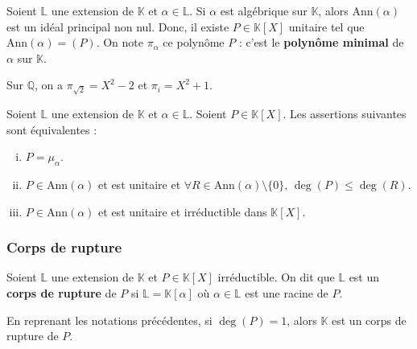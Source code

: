 	\begin{definition}
		Soient $\mathbb{L}$ une extension de $\mathbb{K}$ et $\alpha \in \mathbb{L}$. Si $\alpha$ est algébrique sur $\mathbb{K}$, alors $\mathrm{Ann}(\alpha)$ est un idéal principal non nul. Donc, il existe $P \in \mathbb{K}[X]$ unitaire tel que $\mathrm{Ann}(\alpha) = (P)$. On note $\pi_\alpha$ ce polynôme $P$ : c'est le \textbf{polynôme minimal} de $\alpha$ sur $\mathbb{K}$.
	\end{definition}
	
	\begin{example}
		Sur $\mathbb{Q}$, on a $\pi_{\sqrt{2}} = X^2 - 2$ et $\pi_i = X^2 + 1$.
	\end{example}
	
	
	\begin{proposition}
		Soient $\mathbb{L}$ une extension de $\mathbb{K}$ et $\alpha \in \mathbb{L}$. Soient $P \in \mathbb{K}[X]$. Les assertions suivantes sont équivalentes :
		\begin{enumerate}[(i)]
			\item $P = \mu_\alpha$.
			\item $P \in \mathrm{Ann}(\alpha)$ et est unitaire et $\forall R \in \mathrm{Ann}(\alpha) \setminus \{ 0 \}, \, \deg(P) \leq \deg(R)$.
			\item $P \in \mathrm{Ann}(\alpha)$ et est unitaire et irréductible dans $\mathbb{K}[X]$.
		\end{enumerate}
	\end{proposition}
	
	\subsubsection{Corps de rupture}
	
	
	\begin{definition}
		Soient $\mathbb{L}$ une extension de $\mathbb{K}$ et $P \in \mathbb{K}[X]$ irréductible. On dit que $\mathbb{L}$ est un \textbf{corps de rupture} de $P$ si $\mathbb{L} = \mathbb{K}[\alpha]$ où $\alpha \in \mathbb{L}$ est une racine de $P$.
	\end{definition}
	
	\begin{example}
		En reprenant les notations précédentes, si $\deg(P) = 1$, alors $\mathbb{K}$ est un corps de rupture de $P$.
	\end{example}
	
